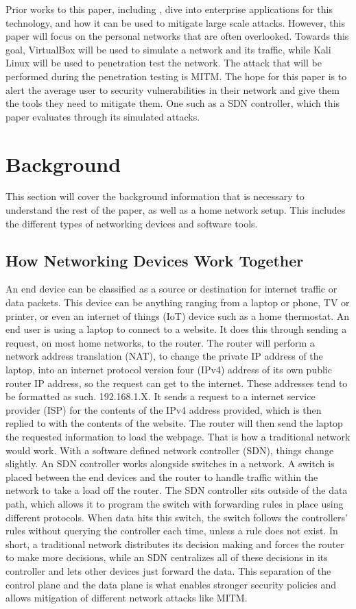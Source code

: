 \documentclass[12pt]{article}
\begin{document}
Prior works to this paper, including \cite{biswas2021mitigation}, dive into enterprise applications for this 
technology, and how it can be used to mitigate large scale attacks. However, this paper will focus on the 
personal networks that are often overlooked. Towards this goal, VirtualBox will be used to simulate a network 
and its traffic, while Kali Linux will be used to penetration test the network. The attack that will be 
performed during the penetration testing is MITM. The hope for this paper is to alert the average user to 
security vulnerabilities in their network and give them the tools they need to mitigate them. One such as a 
SDN controller, which this paper evaluates through its simulated attacks. 


\section{Background}
This section will cover the background information that is necessary to understand the rest of the paper, as 
well as a home network setup. This includes the different types of networking devices and software tools.

\subsection{How Networking Devices Work Together}
An end device can be classified as a source or destination for internet traffic or data packets. 
This device can be anything ranging from a laptop or phone, TV or printer, or even an internet of things 
(IoT) device such as a home thermostat. An end user is using a laptop to connect to a website. It does 
this through sending a request, on most home networks, to the router. The router will perform a network 
address translation (NAT), to change the private IP address of the laptop, into an internet protocol 
version four (IPv4) address of its own public router IP address, so the request can get to the internet. 
These addresses tend to be formatted as such. 192.168.1.X.  It sends a request to a internet service 
provider (ISP) for the contents of the IPv4 address provided, which is then replied to with the contents 
of the website. The router will then send the laptop the requested information to load the webpage. That 
is how a traditional network would work.
With a software defined network controller (SDN), things change slightly. An SDN controller works alongside 
switches in a network. A switch is placed between the end devices and the router to handle traffic within 
the network to take a load off the router. The SDN controller sits outside of the data path, which allows 
it to program the switch with forwarding rules in place using different protocols. When data hits this 
switch, the switch follows the controllers' rules without querying the controller each time, unless a rule 
does not exist.  
In short, a traditional network distributes its decision making and forces the router to make more decisions, 
while an SDN centralizes all of these decisions in its controller and lets other devices just forward the 
data. This separation of the control plane and the data plane is what enables stronger security policies 
and allows mitigation of different network attacks like MITM. 
\end{document}
